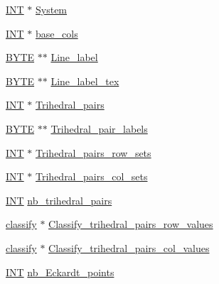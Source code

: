 \begin{DoxyCompactItemize}
\item 
\mbox{\hyperlink{galois_8h_a09fddde158a3a20bd2dcadb609de11dc}{I\+NT}} $\ast$ \mbox{\hyperlink{classsurface_a9dc97d85696e4ddc481ff2e8c758f249}{System}}
\item 
\mbox{\hyperlink{galois_8h_a09fddde158a3a20bd2dcadb609de11dc}{I\+NT}} $\ast$ \mbox{\hyperlink{classsurface_a9b3361daceaf2e36149537590658c298}{base\+\_\+cols}}
\item 
\mbox{\hyperlink{galois_8h_ab6cc7b4aeb6ea31aba2b3fbfc83ff5e6}{B\+Y\+TE}} $\ast$$\ast$ \mbox{\hyperlink{classsurface_a351a4541808c9906ecf63a5a94e98084}{Line\+\_\+label}}
\item 
\mbox{\hyperlink{galois_8h_ab6cc7b4aeb6ea31aba2b3fbfc83ff5e6}{B\+Y\+TE}} $\ast$$\ast$ \mbox{\hyperlink{classsurface_ae6d4aed426c13bcd35a91717c30b58c6}{Line\+\_\+label\+\_\+tex}}
\item 
\mbox{\hyperlink{galois_8h_a09fddde158a3a20bd2dcadb609de11dc}{I\+NT}} $\ast$ \mbox{\hyperlink{classsurface_a3aa583b486ea40f0b8781baddb6e497c}{Trihedral\+\_\+pairs}}
\item 
\mbox{\hyperlink{galois_8h_ab6cc7b4aeb6ea31aba2b3fbfc83ff5e6}{B\+Y\+TE}} $\ast$$\ast$ \mbox{\hyperlink{classsurface_a02cf3afe395c992041eddc480c5f8454}{Trihedral\+\_\+pair\+\_\+labels}}
\item 
\mbox{\hyperlink{galois_8h_a09fddde158a3a20bd2dcadb609de11dc}{I\+NT}} $\ast$ \mbox{\hyperlink{classsurface_a6cc163ecbd5948767c4db598b79a662f}{Trihedral\+\_\+pairs\+\_\+row\+\_\+sets}}
\item 
\mbox{\hyperlink{galois_8h_a09fddde158a3a20bd2dcadb609de11dc}{I\+NT}} $\ast$ \mbox{\hyperlink{classsurface_a9be6d4b7cd6575ed384c04b7f7e13baf}{Trihedral\+\_\+pairs\+\_\+col\+\_\+sets}}
\item 
\mbox{\hyperlink{galois_8h_a09fddde158a3a20bd2dcadb609de11dc}{I\+NT}} \mbox{\hyperlink{classsurface_a4de6c1873251bd19f16221b8a009c9b7}{nb\+\_\+trihedral\+\_\+pairs}}
\item 
\mbox{\hyperlink{classclassify}{classify}} $\ast$ \mbox{\hyperlink{classsurface_a5ff9ce8d3e1dd09b8833efdef3e6ebbd}{Classify\+\_\+trihedral\+\_\+pairs\+\_\+row\+\_\+values}}
\item 
\mbox{\hyperlink{classclassify}{classify}} $\ast$ \mbox{\hyperlink{classsurface_a6fe19bf162fbbc38674dcc481ae9320b}{Classify\+\_\+trihedral\+\_\+pairs\+\_\+col\+\_\+values}}
\item 
\mbox{\hyperlink{galois_8h_a09fddde158a3a20bd2dcadb609de11dc}{I\+NT}} \mbox{\hyperlink{classsurface_a932f57599cbb027981a3f05329e80b4a}{nb\+\_\+\+Eckardt\+\_\+points}}
$$
\end{DoxyCompactItemize}
